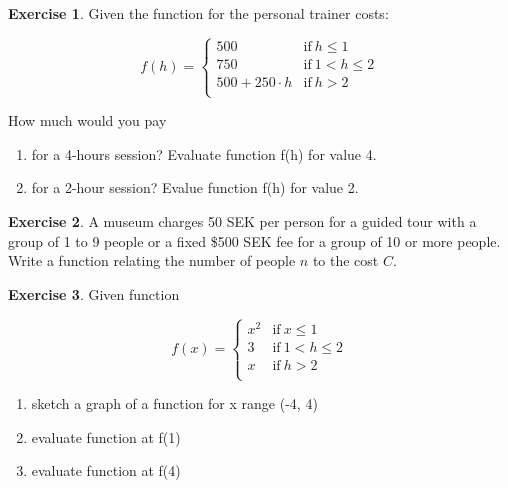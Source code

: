 \documentclass[
]{book}
\providecommand{\tightlist}{%
  \setlength{\itemsep}{0pt}\setlength{\parskip}{0pt}}
\theoremstyle{definition}
\theoremstyle{definition}
\theoremstyle{definition}
\newtheorem{exercise}{Exercise}[chapter]
\theoremstyle{remark}
\begin{document}
\begin{exercise}
\protect\hypertarget{exr:m-functions-evaluate-01}{}{\label{exr:m-functions-evaluate-01} }
Given the function for the personal trainer costs:

\begin{equation}
    f(h) =
    \left\{
        \begin{array}{cc}
                500  & \mathrm{if\ } h \le 1 \\
                750  & \mathrm{if\ } 1 < h \le 2 \\
                500 + 250 \cdot h & \mathrm{if\ } h > 2 \\
        \end{array}
    \right.
\end{equation}

How much would you pay

\begin{enumerate}
\def\labelenumi{\alph{enumi})}
\tightlist
\item
  for a 4-hours session? Evaluate function f(h) for value 4.
\item
  for a 2-hour session? Evalue function f(h) for value 2.
\end{enumerate}
\end{exercise}

\begin{exercise}
\protect\hypertarget{exr:m-functions-write}{}{\label{exr:m-functions-write} }
A museum charges 50 SEK per person for a guided tour with a group of 1 to 9 people or a fixed \$500 SEK fee for a group of 10 or more people. Write a function relating the number of people \(n\) to the cost \(C\).
\end{exercise}

\begin{exercise}
\protect\hypertarget{exr:m-functions-plot-evaluate}{}{\label{exr:m-functions-plot-evaluate} }
Given function

\begin{equation}
    f(x) =
    \left\{
        \begin{array}{cc}
                x^2  & \mathrm{if\ } x \le 1 \\
                3  & \mathrm{if\ } 1 < h \le 2 \\
                x & \mathrm{if\ } h > 2 \\
        \end{array}
    \right.
\end{equation}

\begin{enumerate}
\def\labelenumi{\alph{enumi})}
\tightlist
\item
  sketch a graph of a function for x range (-4, 4)
\item
  evaluate function at f(1)
\item
  evaluate function at f(4)
\end{enumerate}
\end{exercise}
\end{document}
